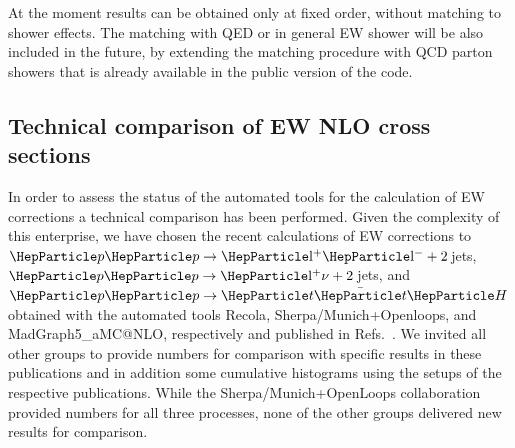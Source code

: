 \documentclass[11pt]{cernrep}
\begin{document}
At the moment results can be obtained only at fixed order, without
matching to shower effects. The matching with QED or in general
EW shower will be also included in the future, by extending
the matching procedure with QCD parton showers that is already
available in the public version of the code.




\subsection{Technical comparison of EW NLO cross sections}
\label{sec:comp;ew}

In order to assess the status of the automated tools for the
calculation of EW corrections a technical comparison has been
performed.  Given the complexity of this enterprise, we have chosen
the recent calculations of EW corrections to $\Pp\Pp\to
\mathrm{\Pl^+\Pl^-}+2{}$\,jets, $\Pp\Pp\to \mathrm{\Pl^+\nu+2}$\,jets, and
$\Pp\Pp\to \PQt\bar\PQt\PH$ obtained with the automated tools {\sc
  Recola}, {\sc Sherpa/Munich+Openloops}, and {\sc MadGraph5\_aMC@NLO},
respectively and published in
Refs.~\cite{Denner:2014ina,Kallweit:2015dum,Frixione:2015zaa}.  We
invited all other groups to provide numbers for comparison with
specific results in these publications and in addition some cumulative
histograms using the setups of the respective publications.  While the
{\sc  Sherpa/Munich+OpenLoops} collaboration provided numbers for all three
processes, none of the other groups delivered new results for
comparison.
\end{document}
